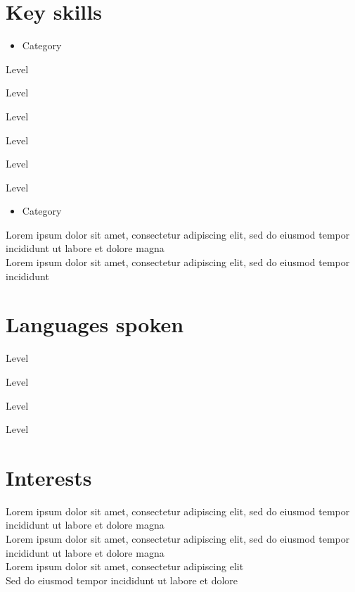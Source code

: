 \documentclass[12pt]{article}
\begin{document}
\begin{minipage}[t]{0.29\textwidth}
\section*{Key skills}
\vspace*{-0.1cm}
\begin{itemize}
    \item Category
\end{itemize}
\vspace*{-0.7cm}
\begin{description}[leftmargin=!,labelwidth=2.5cm]
     \item[Area]       Level
     \item[Area]       Level
     \item[Area]       Level
     \item[Area]       Level
     \item[Area]       Level
     \item[Area]       Level
\end{description}
\vspace*{-0.7cm}
\begin{itemize}
    \item Category
\end{itemize}
\vspace*{-0.2cm}
Lorem ipsum dolor sit amet, consectetur adipiscing elit, sed do eiusmod tempor incididunt ut labore et dolore magna\medskip\\Lorem ipsum dolor sit amet, consectetur adipiscing elit, sed do eiusmod tempor incididunt
\vspace*{-0.5cm}
%
%
\section*{Languages spoken}
\begin{description}[leftmargin=!,labelwidth=2.5cm]
  \item[Language]   Level
  \item[Language]   Level
  \item[Language]   Level
  \item[Language]   Level
\end{description}
\vspace*{-0.8cm}
%
%
\section*{Interests}
Lorem ipsum dolor sit amet, consectetur adipiscing elit, sed do eiusmod tempor incididunt ut labore et dolore magna\medskip\\Lorem ipsum dolor sit amet, consectetur adipiscing elit, sed do eiusmod tempor incididunt ut labore et dolore magna\medskip\\Lorem ipsum dolor sit amet, consectetur adipiscing elit\medskip\\Sed do eiusmod tempor incididunt ut labore et dolore
\end{minipage}
\end{document}
